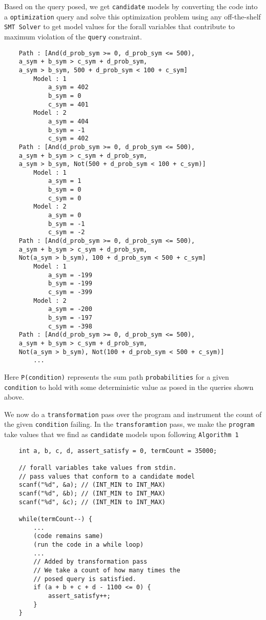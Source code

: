 \documentclass{article}
\begin{document}
Based on the query posed, we get \texttt{candidate} models by converting the code into a \texttt{optimization} query and solve this optimization problem using any off-the-shelf 
\texttt{SMT Solver} to get model values for the forall variables that contribute to maximum 
violation of the \texttt{query} constraint.

\begin{verbatim}
	Path : [And(d_prob_sym >= 0, d_prob_sym <= 500), 
	a_sym + b_sym > c_sym + d_prob_sym, 
	a_sym > b_sym, 500 + d_prob_sym < 100 + c_sym]
		Model : 1
			a_sym = 402
			b_sym = 0
			c_sym = 401
		Model : 2
			a_sym = 404
			b_sym = -1
			c_sym = 402
	Path : [And(d_prob_sym >= 0, d_prob_sym <= 500), 
	a_sym + b_sym > c_sym + d_prob_sym, 
	a_sym > b_sym, Not(500 + d_prob_sym < 100 + c_sym)]
		Model : 1
			a_sym = 1
			b_sym = 0
			c_sym = 0
		Model : 2
			a_sym = 0
			b_sym = -1
			c_sym = -2
	Path : [And(d_prob_sym >= 0, d_prob_sym <= 500), 
	a_sym + b_sym > c_sym + d_prob_sym, 
	Not(a_sym > b_sym), 100 + d_prob_sym < 500 + c_sym]
		Model : 1
			a_sym = -199
			b_sym = -199
			c_sym = -399
		Model : 2
			a_sym = -200
			b_sym = -197
			c_sym = -398
	Path : [And(d_prob_sym >= 0, d_prob_sym <= 500), 
	a_sym + b_sym > c_sym + d_prob_sym, 
	Not(a_sym > b_sym), Not(100 + d_prob_sym < 500 + c_sym)]
		...
\end{verbatim}

Here \texttt{P(condition)} represents the sum path \texttt{probabilities} for a given \texttt{condition} to hold with some deterministic value as posed in the queries shown above.  

We now do a \texttt{transformation} pass over the program and instrument the count of the given \texttt{condition} failing. In the \texttt{transforamtion} pass, we make the \texttt{program} take values that we find as \texttt{candidate} models upon following \texttt{Algorithm 1}

\begin{verbatim}
	int a, b, c, d, assert_satisfy = 0, termCount = 35000;
	
	// forall variables take values from stdin.
	// pass values that conform to a candidate model
	scanf("%d", &a); // (INT_MIN to INT_MAX)
	scanf("%d", &b); // (INT_MIN to INT_MAX)
	scanf("%d", &c); // (INT_MIN to INT_MAX)
	
	while(termCount--) {
		...
		(code remains same)
		(run the code in a while loop)
		...
		// Added by transformation pass
		// We take a count of how many times the 
		// posed query is satisfied.
		if (a + b + c + d - 1100 <= 0) {
			assert_satisfy++;
		}
	}
\end{verbatim}
\end{document}
